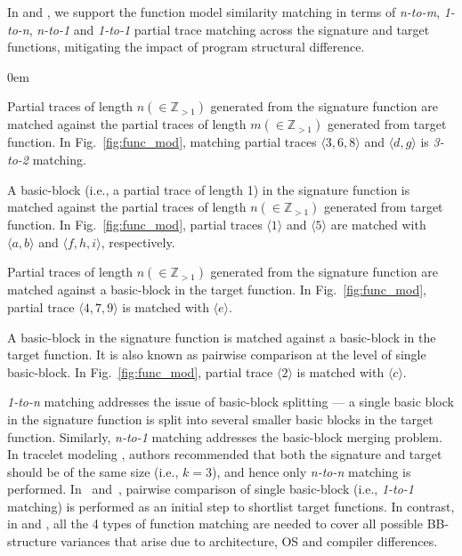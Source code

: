 In \tool and \toolNew, we support the function model similarity matching in terms of \textit{n-to-m}, \textit{1-to-n}, \textit{n-to-1} and \textit{1-to-1} partial trace matching across the signature and target functions, mitigating the impact of program structural difference.
\begin{description}
\itemsep0em
  \item[\textit{n-to-m}] Partial traces of length $n (\in\mathbb Z_{> 1})$ generated from the signature function are matched against the partial traces of length $m (\in\mathbb Z_{> 1})$ generated from target function. In Fig.~\ref{fig:func_mod}, matching partial traces $\langle 3,6,8\rangle$ and $\langle d,g\rangle$ is \textit{3-to-2} matching.
  \item[\textit{1-to-n}] A basic-block (i.e., a partial trace of length 1) in the signature function is matched against the partial traces of   length $n (\in\mathbb Z_{> 1})$ generated from target function. In Fig.~\ref{fig:func_mod}, partial traces $\langle 1\rangle$ and $\langle 5\rangle$ are matched with $\langle a,b\rangle$ and $\langle f,h,i\rangle$, respectively.
  \item[\textit{n-to-1}] Partial traces of length $n (\in\mathbb Z_{> 1})$ generated from the signature function are matched against a basic-block in the target function. In Fig.~\ref{fig:func_mod}, partial trace $\langle 4,7,9 \rangle$ is matched with $\langle e \rangle$.
  \item[\textit{1-to-1}] A basic-block in the signature function is matched against a basic-block in the target function. It is also known as pairwise comparison at the level of single basic-block. In Fig.~\ref{fig:func_mod}, partial trace $\langle 2\rangle$ is matched with $\langle c\rangle$.
\end{description}

\textit{1-to-n} matching addresses the issue of basic-block splitting --- a single basic block in the signature function is split into several smaller basic blocks in the target function. Similarly, \textit{n-to-1} matching addresses the basic-block merging problem.
In tracelet modeling \cite{DBLP:conf/pldi/DavidY14}, authors recommended that both the signature and target should be of the same size (i.e., $k=3$), and hence only \textit{n-to-n} matching is performed.
In~\cite{DBLP:conf/sp/PewnyGGRH15} and~\cite{luo2014semantics}, pairwise comparison of single basic-block (i.e., \textit{1-to-1} matching) is performed as an initial step to shortlist target functions. In contrast, in \tool and \toolNew, all the  4 types of function matching are needed to cover all possible BB-structure variances that arise due to architecture, OS and compiler differences.



